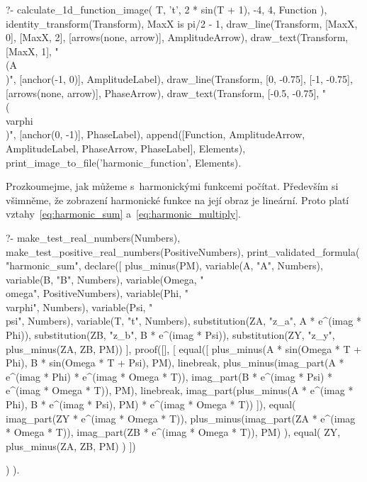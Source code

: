\begin{prolog}
?-	calculate_1d_function_image(
		T,
		't',
		2 * sin(T + 1),
		-4, 4,
		Function
	),
	identity_transform(Transform),
	MaxX is pi/2 - 1,
	draw_line(Transform, [MaxX, 0], [MaxX, 2], [arrows(none, arrow)], AmplitudeArrow),
	draw_text(Transform, [MaxX, 1], "\\(A\\)", [anchor(-1, 0)], AmplitudeLabel),
	draw_line(Transform, [0, -0.75], [-1, -0.75], [arrows(none, arrow)], PhaseArrow),
	draw_text(Transform, [-0.5, -0.75], "\\(\\varphi\\)", [anchor(0, -1)], PhaseLabel),
	append([Function, AmplitudeArrow, AmplitudeLabel, PhaseArrow, PhaseLabel], Elements),
	print_image_to_file('harmonic_function', Elements).
\end{prolog}

Prozkoumejme, jak můžeme s~harmonickými funkcemi počítat.
Především si všimněme, že zobrazení harmonické funkce na její obraz je lineární. Proto platí vztahy~\eqref{eq:harmonic_sum} a~\eqref{eq:harmonic_multiply}.

\begin{prolog}
?-	make_test_real_numbers(Numbers),
	make_test_positive_real_numbers(PositiveNumbers),
	print_validated_formula(
		"harmonic_sum",
		declare([
			plus_minus(PM),
			variable(A, "A", Numbers),
			variable(B, "B", Numbers),
			variable(Omega, "\\omega", PositiveNumbers),
			variable(Phi, "\\varphi", Numbers),
			variable(Psi, "\\psi", Numbers),
			variable(T, "t", Numbers),
			substitution(ZA, "z_a", A * e^(imag * Phi)),
			substitution(ZB, "z_b", B * e^(imag * Psi)),
			substitution(ZY, "z_y", plus_minus(ZA, ZB, PM))
		],
			proof([],
			[
				equal([
					plus_minus(A * sin(Omega * T + Phi), B * sin(Omega * T + Psi), PM),
					linebreak,
					plus_minus(imag_part(A * e^(imag * Phi) * e^(imag * Omega * T)), imag_part(B * e^(imag * Psi) * e^(imag * Omega * T)), PM),
					linebreak,
					imag_part(plus_minus(A * e^(imag * Phi), B * e^(imag * Psi), PM) * e^(imag * Omega * T))
				]),
				equal(
					imag_part(ZY * e^(imag * Omega * T)),
					plus_minus(imag_part(ZA * e^(imag * Omega * T)), imag_part(ZB * e^(imag * Omega * T)), PM)
				),
				equal(
					ZY,
					plus_minus(ZA, ZB, PM)
				)
			])
				
		)
	).
\end{prolog}

